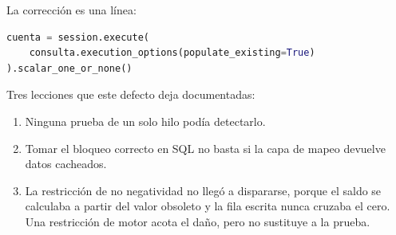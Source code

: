 La corrección es una línea:

\begin{lstlisting}[language=Python,caption={Sin \codigo{populate\_existing} el
bloqueo se toma pero se razona sobre datos antiguos.},label={lst:populate}]
cuenta = session.execute(
    consulta.execution_options(populate_existing=True)
).scalar_one_or_none()
\end{lstlisting}

Tres lecciones que este defecto deja documentadas:

\begin{enumerate}[leftmargin=1.4em]
  \item Ninguna prueba de un solo hilo podía detectarlo.
  \item Tomar el bloqueo correcto en SQL no basta si la capa de mapeo
    devuelve datos cacheados.
  \item La restricción  de no negatividad no llegó a dispararse,
    porque el saldo se calculaba a partir del valor obsoleto y la fila escrita
    nunca cruzaba el cero. Una restricción de motor acota el daño, pero no
    sustituye a la prueba.
\end{enumerate}
